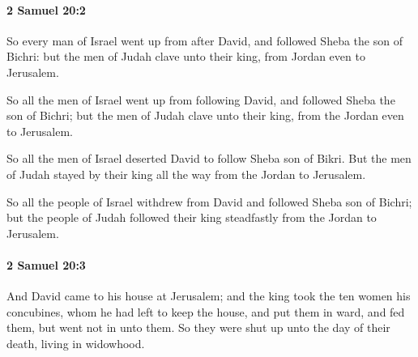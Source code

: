 		\paragraph{2 Samuel 20:2} %
			\label{2SAMUEL-20-2}

			So every man of Israel went up from after David, and followed Sheba the son of Bichri: but the men of Judah clave unto their king, from Jordan even to Jerusalem.

			\begin{versebox}
					\item[BHS] 
					\item[ASV] So all the men of Israel went up from following David, and followed Sheba the son of Bichri; but the men of Judah clave unto their king, from the Jordan even to Jerusalem.
					\item[NIV] So all the men of Israel deserted David to follow Sheba son of Bikri. But the men of Judah stayed by their king all the way from the Jordan to Jerusalem.
					\item[NRSV] So all the people of Israel withdrew from David and followed Sheba son of Bichri; but the people of Judah followed their king steadfastly from the Jordan to Jerusalem.
			\end{versebox}

		\paragraph{2 Samuel 20:3} %
			\label{2SAMUEL-20-3}

			And David came to his house at Jerusalem; and the king took the ten women his concubines, whom he had left to keep the house, and put them in ward, and fed them, but went not in unto them. So they were shut up unto the day of their death, living in widowhood.

